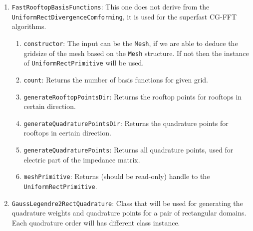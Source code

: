\documentclass[9pt]{article}
\begin{document}
\begin{enumerate}[label=\Roman*.]
        \begin{enumerate}[label=\roman*.]
            \item \texttt{constructor}: Requires the instance of \texttt{GaussLegendre2RectQuadrature} and \texttt{Mesh} or \texttt{MeshCluster} for the base class.
            \item \texttt{generate}: Triggers the \texttt{generate} function from the base class. Then it generates the points of the given quadrature. 
            \item \texttt{generateRooftops}: Computes all points and values (length, height, ...) associated with all rooftops, the cell arrays are divided into 2 because of the large memeory requirements of the points which are transformed into arrays for future computing.
        \end{enumerate}
        \item \texttt{FastRooftopBasisFunctions}: This one does not derive from the \texttt{UniformRectDivergenceComforming}, it is used for the superfast CG-FFT algorithms.
        \begin{enumerate}[label=\roman*.]
            \item \texttt{constructor}: The input can be the \texttt{Mesh}, if we are able to deduce the gridsize of the mesh based on the \texttt{Mesh} structure. If not then the instance of \texttt{UniformRectPrimitive} will be used.
            \item \texttt{count}: Returns the number of basis functions for given grid.
            \item \texttt{generateRooftopPointsDir}: Returns the rooftop points for rooftops in certain direction.
            \item \texttt{generateQuadraturePointsDir}: Returns the quadrature points for rooftops in certain direction.
            \item \texttt{generateQuadraturePoints}: Returns all quadrature points, used for electric part of the impedance matrix.
            \item \texttt{meshPrimitive}: Returns (should be read-only) handle to the \texttt{UniformRectPrimitive}.
        \end{enumerate}
        \item \texttt{GaussLegendre2RectQuadrature}: Class that will be used for generating the quadrature weights and quadrature points for a pair of rectangular domains. Each quadrature order will has different class instance.
        \begin{enumerate}[label=\roman*.]

\end{enumerate}
\end{enumerate}
\end{document}
